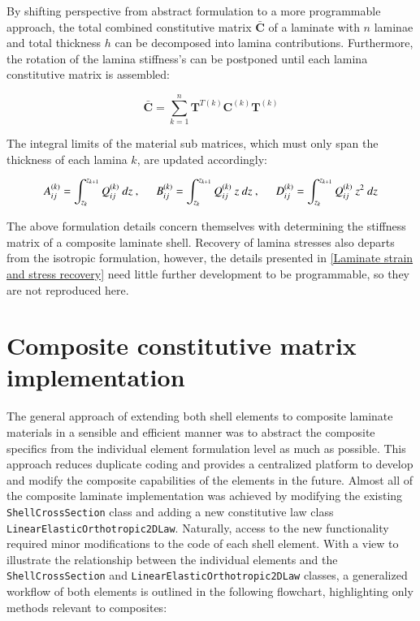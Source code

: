 By shifting perspective from abstract formulation to a more programmable approach, the total combined constitutive matrix $\bar{\mathbf{C}}$ of a laminate with $n$ laminae and total thickness $h$ can be decomposed into lamina contributions. Furthermore, the rotation of the lamina stiffness's can be postponed until each lamina constitutive matrix is assembled:

\begin{equation} 
 \bar{\mathbf{C}} = \sum_{k=1}^{n}  \mathbf{T}^{T(k)} {\mathbf{C}}^{(k)}  \mathbf{T}^{(k)}
\label{eqscomp_laminate_form3}
\end{equation}

The integral limits of the material sub matrices, which must only span the thickness of each lamina $k$, are updated accordingly:

\begin{equation} 
A_{ij}^{(k)} = 
\int_{z_k}^{z_{k+1}}
{Q}_{ij}^{(k)}
\ dz\ ,
\hspace{5mm}
B_{ij}^{(k)} = 
\int_{z_k}^{z_{k+1}}
{Q}_{ij}^{(k)}\ z
\ dz\ ,
\hspace{5mm}
D_{ij}^{(k)} = 
\int_{z_k}^{z_{k+1}}
{Q}_{ij}^{(k)}\ z^2
\ dz
\label{eqscomp_laminate_form4}
\end{equation} 

The above formulation details concern themselves with determining the stiffness matrix of a composite laminate shell. Recovery of lamina stresses also departs from the isotropic formulation, however, the details presented in \ref{Laminate strain and stress recovery} need little further development to be programmable, so they are not reproduced here.

\section{Composite constitutive matrix implementation}
The general approach of extending both shell elements to composite laminate materials in a sensible and efficient manner was to abstract the composite specifics from the individual element formulation level as much as possible. This approach reduces duplicate coding and provides a centralized platform to develop and modify the composite capabilities of the elements in the future. Almost all of the composite laminate implementation was achieved by modifying the existing \texttt{ShellCrossSection} class and adding a new constitutive law class \texttt{LinearElasticOrthotropic2DLaw}. Naturally, access to the new functionality required minor modifications to the code of each shell element. With a view to illustrate the relationship between the individual elements and the \texttt{ShellCrossSection} and \texttt{LinearElasticOrthotropic2DLaw} classes, a generalized workflow of both elements is outlined in the following flowchart, highlighting only methods relevant to composites:

